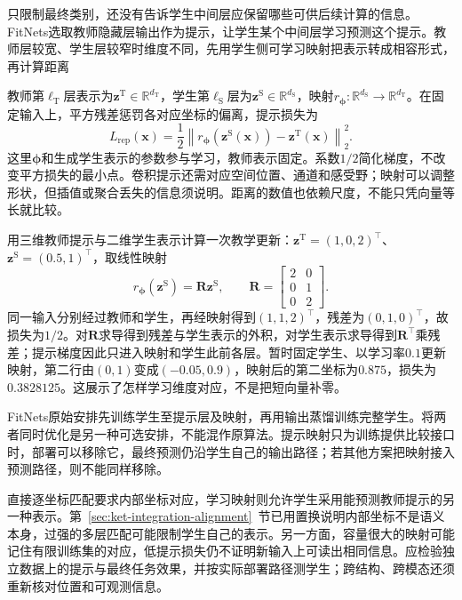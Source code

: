 只限制最终类别，还没有告诉学生中间层应保留哪些可供后续计算的信息。FitNets选取教师隐藏层输出作为提示，让学生某个中间层学习预测这个提示。教师层较宽、学生层较窄时维度不同，先用学生侧可学习映射把表示转成相容形式，再计算距离

教师第$\ell_{\mathrm{T}}$层表示为$\bm{z}^{\mathrm{T}}\in\mathbb{R}^{d_{\mathrm{T}}}$，学生第$\ell_{\mathrm{S}}$层为$\bm{z}^{\mathrm{S}}\in\mathbb{R}^{d_{\mathrm{S}}}$，映射$r_{\bm{\phi}}:\mathbb{R}^{d_{\mathrm{S}}}\to\mathbb{R}^{d_{\mathrm{T}}}$。在固定输入上，平方残差惩罚各对应坐标的偏离，提示损失为
\begin{equation}
  L_{\mathrm{rep}}(\bm{x})
   =\frac{1}{2}\left\|
      r_{\bm{\phi}}(\bm{z}^{\mathrm{S}}(\bm{x}))
        -\bm{z}^{\mathrm{T}}(\bm{x})
     \right\|_2^2.
  \label{eq:ket-integration-feature-loss}
\end{equation}
这里$\bm{\phi}$和生成学生表示的参数参与学习，教师表示固定。系数$1/2$简化梯度，不改变平方损失的最小点。卷积提示还需对应空间位置、通道和感受野；映射可以调整形状，但插值或聚合丢失的信息须说明。距离的数值也依赖尺度，不能只凭向量等长就比较。

用三维教师提示与二维学生表示计算一次教学更新：$\bm{z}^{\mathrm{T}}=(1,0,2)^\top$、$\bm{z}^{\mathrm{S}}=(0.5,1)^\top$，取线性映射
\[
  r_{\bm{\phi}}(\bm{z}^{\mathrm{S}})=\bm{R}\bm{z}^{\mathrm{S}},
  \qquad
  \bm{R}=\begin{bmatrix}2&0\\0&1\\0&2\end{bmatrix}.
\]
同一输入分别经过教师和学生，再经映射得到$(1,1,2)^\top$，残差为$(0,1,0)^\top$，故损失为$1/2$。对$\bm{R}$求导得到残差与学生表示的外积，对学生表示求导得到$\bm{R}^{\top}$乘残差；提示梯度因此只进入映射和学生此前各层。暂时固定学生、以学习率$0.1$更新映射，第二行由$(0,1)$变成$(-0.05,0.9)$，映射后的第二坐标为$0.875$，损失为$0.3828125$。这展示了怎样学习维度对应，不是把短向量补零。

FitNets原始安排先训练学生至提示层及映射，再用输出蒸馏训练完整学生。将两者同时优化是另一种可选安排，不能混作原算法。提示映射只为训练提供比较接口时，部署可以移除它，最终预测仍沿学生自己的输出路径；若其他方案把映射接入预测路径，则不能同样移除。

直接逐坐标匹配要求内部坐标对应，学习映射则允许学生采用能预测教师提示的另一种表示。第~\ref{sec:ket-integration-alignment}~节已用置换说明内部坐标不是语义本身，过强的多层匹配可能限制学生自己的表示。另一方面，容量很大的映射可能记住有限训练集的对应，低提示损失仍不证明新输入上可读出相同信息。应检验独立数据上的提示与最终任务效果，并按实际部署路径测学生；跨结构、跨模态还须重新核对位置和可观测信息。

